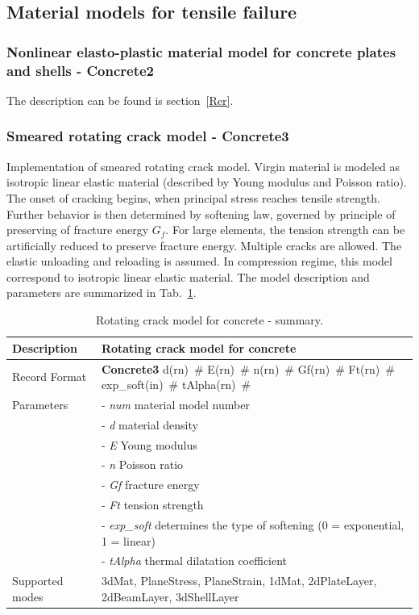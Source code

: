 \documentclass[a4paper]{article}
\newcommand{\descitem}[1]{{\noindent \bf #1}}
\newcommand{\elemparam}[2]{{{#1\tiny (#2)}~\#}}
\newcommand{\param}[1]{{\it #1}}
\begin{document}
\subsection{Material models for tensile failure}
\subsubsection{Nonlinear elasto-plastic material model for concrete
plates and shells - Concrete2}
The description can be found is section~\ref{Rer}.



\subsubsection{Smeared rotating crack model - Concrete3}
\label{rcm}
Implementation of smeared rotating crack model.
Virgin material is modeled as isotropic linear elastic material
(described by Young modulus and Poisson
ratio). The onset of cracking begins, when principal stress reaches
tensile strength.
Further behavior is then determined by softening law,
governed by principle of preserving of fracture
energy $G_f$. For large elements, the tension strength can be
artificially reduced
to preserve fracture energy. Multiple cracks are allowed.
The elastic unloading and reloading is assumed.
In compression regime, this model correspond to isotropic linear elastic material.
The model description and parameters are summarized
in Tab.~\ref{rcm_table}.

\begin{table}[!htb]
\begin{tabular}{|l|p{9cm}|}
\hline
Description & Rotating crack model for concrete\\
\hline
Record Format & \descitem{Concrete3} \elemparam{d}{rn} \elemparam{E}{rn}
\elemparam{n}{rn} \elemparam{Gf}{rn} \elemparam{Ft}{rn} \elemparam{exp\_soft}{in} \elemparam{tAlpha}{rn} \\
Parameters &- \param{num} material model number\\
&- \param{d} material density\\
&- \param{E} Young modulus\\
&- \param{n} Poisson ratio\\
&- \param{Gf} fracture energy\\
&- \param{Ft} tension strength\\
&- \param{exp\_soft} determines the type of softening (0 =
exponential, 1 = linear)\\
&- \param{tAlpha} thermal dilatation coefficient\\
Supported modes& 3dMat, PlaneStress, PlaneStrain, 1dMat,
2dPlateLayer, 2dBeamLayer, 3dShellLayer\\
\hline
\end{tabular}
\caption{Rotating crack model for concrete - summary.}
\label{rcm_table}
\end{table}
\end{document}
